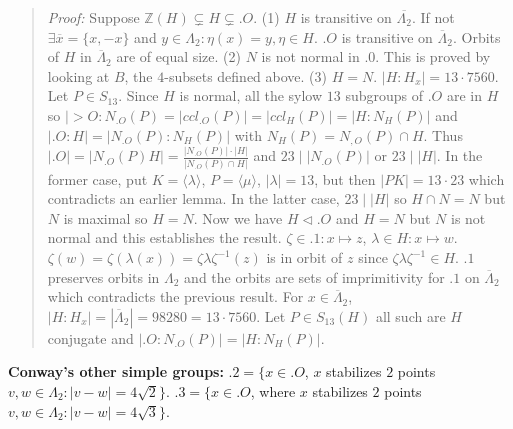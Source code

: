 \begin{quote}
\emph{Proof:} 
Suppose ${\mathbb Z}(H) \subsetneq H \subsetneq .O$.  
(1) $H$ is transitive on ${\overline {\Lambda_2}}$.
If not $\exists {\overline x}= \{x, -x\}$
and $y \in \Lambda_2: \eta(x)= y, \eta \in H$.  $.O$ is transitive on
${\overline {\Lambda}}_2$.  Orbits of $H$ in ${\overline {\Lambda}}_2$ are of
equal size.
(2) $N$ is not normal in $.0$.  This is proved by looking at $B$, the $4$-subsets defined above.
(3) $H=N$.  $|H:H_x|= 13 \cdot 7560$.  Let $P \in S_{13}$.  Since $H$ is normal, all the sylow $13$
subgroups of $.O$ are in $H$ so
$|>O:N_{.O}(P)= |ccl_{.O}(P)|=
|ccl_{H}(P)|= |H:N_H(P)|$ and $|.O:H|= |N_{.O}(P):N_H(P)|$ with $N_H(P)= N_{,O}(P) \cap H$.
Thus $|.O|= |N_{.O}(P)H|= {\frac
{|N_{.O}(P)| \cdot |H|}
{|N_{.O}(P) \cap H|}}$ and
$23 \mid |N_{.O}(P)|$ or $23 \mid |H|$.  In the former case, put
$K= \langle \lambda \rangle$,
$P= \langle \mu \rangle$, $|\lambda|= 13$, but then $|PK|=13 \cdot 23$ which contradicts an
earlier lemma.  In the latter case,  $23 \mid |H|$ so $H \cap N = N$ but $N$ is maximal so
$H=N$.
Now we have $H \lhd .O$ and $H=N$ but $N$ is not normal and this establishes the result.
$\zeta \in .1: x \mapsto z$,
$\lambda \in H: x \mapsto w$.
$\zeta(w)= \zeta(\lambda(x))= \zeta \lambda \zeta^{-1}(z)$ is in orbit of $z$
since $\zeta \lambda \zeta^{-1} \in H$.  $.1$ preserves orbits in
$\Lambda_2$ and the orbits are sets of imprimitivity for $.1$ on
${\overline {\Lambda}}_2$ which contradicts the previous result.
For $x \in {\overline {\Lambda}}_2$, 
$|H:H_x|=|{\overline {\Lambda}}_2| = 98280= 13 \cdot 7560$.
Let $P \in S_{13}(H)$ all such are $H$ conjugate and
$|.O:N_{.O}(P)|= |H:N_H(P)|$.
\end{quote}
{\bf Conway's other simple groups:} 
$.2= \{ x \in .O$, $x$ stabilizes
$2$ points $v,w \in \Lambda_2: |v-w|= 4 {\sqrt 2} \}$.
$.3= \{ x \in .O$, where $x$ stabilizes
$2$ points $v,w \in \Lambda_2: |v-w|= 4 {\sqrt 3} \}$.
